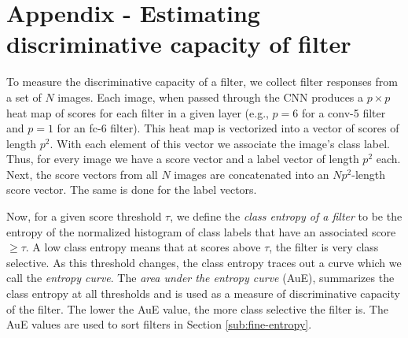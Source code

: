 \section*{Appendix - Estimating discriminative capacity of filter}
\label{sub:app-entropy}
To measure the discriminative capacity of a filter, we collect filter responses from a set of $N$ images.
Each image, when passed through the CNN produces a $p \times p$ heat map of scores for each filter in a given layer (e.g., $p = 6$ for a conv-5 filter and $p = 1$ for an fc-6 filter).
This heat map is vectorized into a vector of scores of length $p^2$. With each element of this vector we associate the image's class label. 
Thus, for every image we have a score vector and a label vector of length $p^2$ each.
Next, the score vectors from all $N$ images are concatenated into an $Np^2$-length score vector.
The same is done for the label vectors.

Now, for a given score threshold $\tau$, we define the \emph{class entropy of a filter} to be the entropy of the normalized histogram of class labels that have an associated score $\geq \tau$.
A low class entropy means that at scores above $\tau$, the filter is very class selective.
As this threshold changes, the class entropy traces out a curve which we call the \emph{entropy curve}.
The \emph{area under the entropy curve} (AuE), summarizes the class entropy at all thresholds and is used as a measure of discriminative capacity of the filter. 
The lower the AuE value, the more class selective the filter is.
The AuE values are used to sort filters in Section \ref{sub:fine-entropy}.



